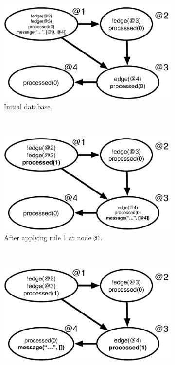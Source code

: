 \begin{figure}[h]
        \centering
        \begin{subfigure}[b]{0.5\textwidth}
                \includegraphics[width=\textwidth]{figures/message/message_trace1}
                \caption{Initial database.}
                \label{fig:message_trace1}
        \end{subfigure}%
        ~
        \begin{subfigure}[b]{0.5\textwidth}
                \includegraphics[width=\textwidth]{figures/message/message_trace2}
                \caption{After applying rule 1 at node \texttt{@1}.}
                \label{fig:message_trace2}
        \end{subfigure}\\
        \begin{subfigure}[b]{0.5\textwidth}
                \includegraphics[width=\textwidth]{figures/message/message_trace3}

\end{subfigure}
\end{figure}

